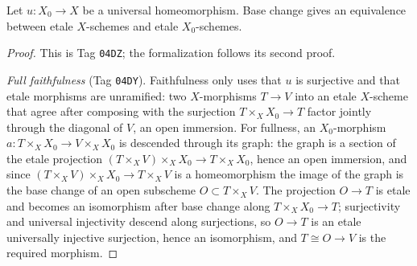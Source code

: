 \begin{lemma}
\label{lemma:weil-pbc-universal-homeomorphism-site-equivalence}
\uses{}
\leanok

Let $u:X_0\to X$ be a universal homeomorphism.  Base change gives an
equivalence between etale $X$-schemes and etale $X_0$-schemes.
\end{lemma}
\begin{proof}
\uses{}
\leanok

This is Tag \texttt{04DZ}; the formalization follows its second proof.

\emph{Full faithfulness} (Tag \texttt{04DY}).  Faithfulness only uses that
$u$ is surjective and that etale morphisms are unramified: two
$X$-morphisms $T\to V$ into an etale $X$-scheme that agree after composing
with the surjection $T\times_XX_0\to T$ factor jointly through the diagonal
of $V$, an open immersion.  For fullness, an $X_0$-morphism
$a:T\times_XX_0\to V\times_XX_0$ is descended through its graph: the graph
is a section of the etale projection $(T\times_XV)\times_XX_0\to T\times_XX_0$,
hence an open immersion, and since $(T\times_XV)\times_XX_0\to T\times_XV$ is
a homeomorphism the image of the graph is the base change of an open
subscheme $O\subset T\times_XV$.  The projection $O\to T$ is etale and becomes
an isomorphism after base change along $T\times_XX_0\to T$; surjectivity and
universal injectivity descend along surjections, so $O\to T$ is an etale
universally injective surjection, hence an isomorphism, and $T\cong O\to V$
is the required morphism.


\end{proof}
